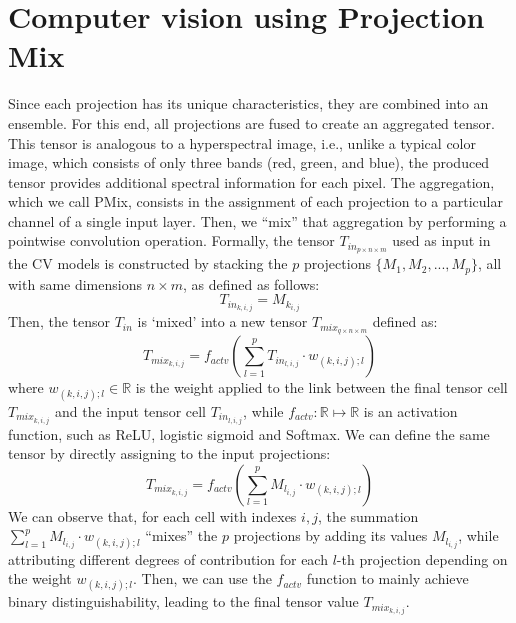 

\section{Computer vision using Projection Mix}

Since each projection has its unique characteristics, they are combined into an ensemble. For this end, all projections are fused to create an aggregated tensor. This tensor is analogous to a hyperspectral image, i.e., unlike a typical color image, which consists of only three bands (red, green, and blue), the produced tensor provides additional spectral information for each pixel. The aggregation, which we call \gls{PMix}, consists in the assignment of each projection to a particular channel of a single input layer. Then, we ``mix'' that aggregation by performing a pointwise  convolution operation. Formally, the tensor $T_{in_{p \times n \times m}}$ used as input in the \gls{CV} models is constructed by stacking the $p$ projections $\{M_1, M_2, ..., M_p\}$, all with same dimensions $n \times m$, as defined as follows:
\begin{equation}
    T_{in_{k,i,j}} = M_{k_{i,j}}
\end{equation}
\noindent Then, the tensor $T_{in}$ is `mixed' into a new tensor $T_{mix_{q \times n \times m}}$ defined as:
\begin{equation}
    T_{mix_{k,i,j}} = f_{actv}\left(\sum\limits_{l=1}^{p}T_{in_{l,i,j}} \cdot w_{(k,i,j);l}\right)
\end{equation} 
\noindent where $w_{(k,i,j);l} \in \mathbb{R}$ is the weight applied to the link between the final tensor cell $T_{mix_{k,i,j}}$ and the input tensor cell $T_{in_{l,i,j}}$, while $f_{actv}: \mathbb{R} \mapsto \mathbb{R}$ is an activation function, such as ReLU, logistic sigmoid and Softmax. We can define the same tensor by directly assigning to the input projections:
\begin{equation}
    \label{eq:mix}
    T_{mix_{k,i,j}} = f_{actv}\left(\sum\limits_{l=1}^{p}M_{l_{i,j}} \cdot w_{(k,i,j);l}\right)
\end{equation}
\noindent We can observe that, for each cell with indexes $i,j$, the summation $\sum\limits_{l=1}^{p}M_{l_{i,j}} \cdot w_{(k,i,j);l}$ ``mixes'' the $p$ projections by adding its values $M_{l_{i,j}}$, while attributing different degrees of contribution for each $l$-th projection depending on the weight $w_{(k,i,j);l}$. Then, we can use the $f_{actv}$ function to mainly achieve binary distinguishability, leading to the final tensor value $T_{mix_{k,i,j}}$. 


